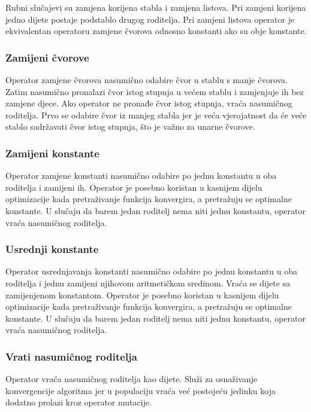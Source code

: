 \documentclass[times, utf8, numeric, diplomski]{fer}
\begin{document}
Rubni slučajevi su zamjena korijena stabla i zamjena listova. Pri zamjeni korijena jedno dijete postaje podstablo drugog roditelja. Pri zamjeni listova operator je ekvivalentan operatoru zamjene čvorova odnosno konstanti ako su obje konstante.


\subsubsection{Zamijeni čvorove}
Operator zamjene čvorova nasumično odabire čvor u stablu s manje čvorova. Zatim nasumično pronalazi čvor istog stupnja u većem stablu i zamjenjuje ih bez zamjene djece. Ako operator ne pronađe čvor istog stupnja, vraća nasumičnog roditelja. Prvo se odabire čvor iz manjeg stabla jer je veća vjerojatnost da će veće stablo sadržavati čvor istog stupnja, što je važno za unarne čvorove.

\subsubsection{Zamijeni konstante}
Operator zamjene konstanti nasumično odabire po jednu konstantu u oba roditelja i zamijeni ih. Operator je posebno koristan u kasnijem dijelu optimizacije kada pretraživanje funkcija konvergira, a pretražuju se optimalne konstante. U slučaju da barem jedan roditelj nema niti jednu konstantu, operator vraća nasumičnog roditelja.

\subsubsection{Usrednji konstante}
Operator usrednjavanja konstanti nasumično odabire po jednu konstantu u oba roditelja i jednu zamijeni njihovom aritmetičkom sredinom. Vraća se dijete sa zamijenjenom konstantom. Operator je posebno koristan u kasnijem dijelu optimizacije kada pretraživanje funkcija konvergira, a pretražuju se optimalne konstante. U slučaju da barem jedan roditelj nema niti jednu konstantu, operator vraća nasumičnog roditelja.

\subsubsection{Vrati nasumičnog roditelja}
Operator vraća nasumičnog roditelja kao dijete. Služi za osnaživanje konvergencije algoritma jer u populaciju vraća već postojeću jedinku koja dodatno prolazi kroz operator mutacije.
\end{document}
